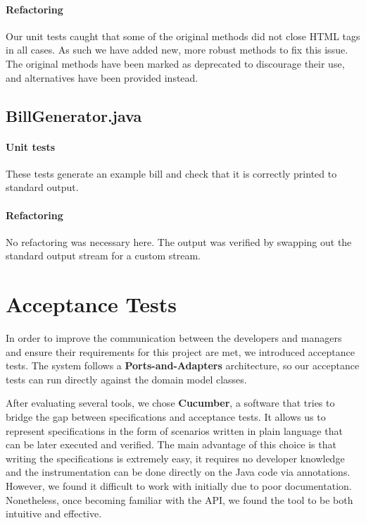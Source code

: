 \documentclass[a4paper]{article}
\begin{document}
\paragraph{Refactoring} Our unit tests caught that some of the original methods did not close HTML tags in all cases. As such we have added new, more robust methods to fix this issue. The original methods have been marked as deprecated to discourage their use, and alternatives have been provided instead.

\subsection{BillGenerator.java}
\paragraph{Unit tests} These tests generate an example bill and check that it is correctly printed to standard output.
\paragraph{Refactoring} No refactoring was necessary here. The output was verified by swapping out the standard output stream for a custom stream.

\section{Acceptance Tests}
In order to improve the communication between the developers and managers and ensure their requirements for this project are met, we introduced acceptance tests. The system follows a {\bf Ports-and-Adapters} architecture, so our acceptance tests can run directly against the domain model classes.

After evaluating several tools, we chose {\bf Cucumber}, a software that tries to bridge the gap between specifications and acceptance tests. It allows us to represent specifications in the form of scenarios written in plain language that can be later executed and verified. The main advantage of this choice is that writing the specifications is extremely easy, it requires no developer knowledge and the instrumentation can be done directly on the Java code via annotations. However, we found it difficult to work with initially due to poor documentation. Nonetheless, once becoming familiar with the API, we found the tool to be both intuitive and effective.
\end{document}
